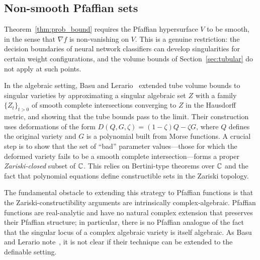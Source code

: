 \subsection{Non-smooth Pfaffian sets}\label{subsec:nonsmooth}
Theorem~\ref{thm:prob_bound} requires the Pfaffian hypersurface $V$ to be smooth, in the sense that $\nabla f$ is non-vanishing on $V$. This is a genuine restriction: the decision boundaries of neural network classifiers can develop singularities for certain weight configurations, and the volume bounds of Section~\ref{sec:tubular} do not apply at such points.

In the algebraic setting, Basu and Lerario~\cite{basu2021hausdorff} extended tube volume bounds to singular varieties by approximating a singular algebraic set $Z$ with a family $\{Z_t\}_{t > 0}$ of smooth complete intersections converging to $Z$ in the Hausdorff metric, and showing that the tube bounds pass to the limit. Their construction uses deformations of the form $D(Q, G, \zeta) = (1-\zeta)Q - \zeta G$, where $Q$ defines the original variety and $G$ is a polynomial built from Morse functions. A crucial step is to show that the set of ``bad'' parameter values---those for which the deformed variety fails to be a smooth complete intersection---forms a proper \emph{Zariski-closed} subset of $\mathbb{C}$. This relies on Bertini-type theorems over $\mathbb{C}$ and the fact that polynomial equations define constructible sets in the Zariski topology.

The fundamental obstacle to extending this strategy to Pfaffian functions is that the Zariski-constructibility arguments are intrinsically complex-algebraic. Pfaffian functions are real-analytic and have no natural complex extension that preserves their Pfaffian structure; in particular, there is no Pfaffian analogue of the fact that the singular locus of a complex algebraic variety is itself algebraic. As Basu and Lerario note~\cite[Remark~1.2]{basu2021hausdorff}, it is not clear if their technique can be extended to the definable setting.

